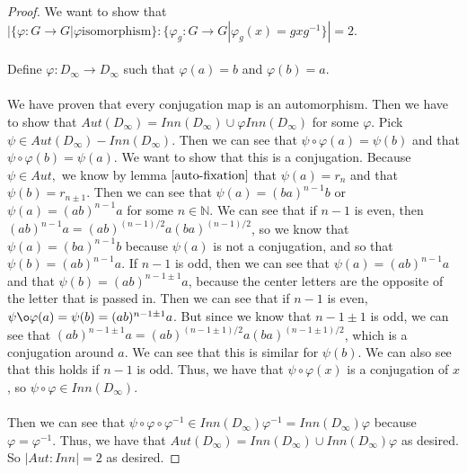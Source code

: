 \documentclass{article}
\theoremstyle{definition}
\begin{document}
\begin{proof}
    We want to show that $|\{\varphi: G \rightarrow G | \varphi \text{isomorphism}\}: \{\varphi_g : G \rightarrow G | \varphi_g(x) = gxg^{-1}\}| = 2$. \\
\\
Define $\varphi: D_\infty \rightarrow D_\infty$ such that $\varphi(a) = b$ and $\varphi(b) = a$.\\
\\
We have proven that every conjugation map is an automorphism.
Then we have to show that $Aut(D_\infty) = Inn(D_\infty) \cup \varphi Inn(D_\infty)$ for some $\varphi$.
Pick $\psi \in Aut(D_\infty) - Inn(D_\infty)$. Then we can see that $\psi \circ \varphi(a) = \psi(b)$ and that $\psi \circ \varphi(b) = \psi(a)$. We want to show that this is a conjugation. Because $\psi \in Aut,$ we know by lemma $\ref{auto-fixation}$ that $\psi(a) = r_n$ and that $\psi(b) = r_{n \pm 1}$. Then we can see that $\psi(a) = (ba)^{n-1}b$ or $\psi(a) = (ab)^{n-1}a$ for some $n \in \mathbb{N}$. We can see that if $n-1$ is even, then $(ab)^{n-1}a = (ab)^{(n-1)/2}a(ba)^{(n-1)/2}$, so we know that $\psi(a) = (ba)^{n-1}b$ because $\psi(a)$ is not a conjugation, and so that $\psi(b) = (ab)^{n-1}a$. If $n-1$ is odd, then we can see that $\psi(a) = (ab)^{n-1}a$ and that $\psi(b) = (ab)^{n-1\pm1}a$, because the center letters are the opposite of the letter that is passed in. Then we can see that if $n-1$ is even, $\psi \o \varphi(a) = \psi(b) = (ab)^{n-1\pm1}a$. But since we know that $n-1\pm1$ is odd, we can see that $(ab)^{n-1\pm1}a = (ab)^{(n-1\pm1)/2}a(ba)^{(n-1\pm1)/2}$, which is a conjugation around $a$. We can see that this is similar for $\psi(b)$. We can also see that this holds if $n-1$ is odd. Thus, we have that $\psi \circ \varphi(x)$ is a conjugation of $x$, so $\psi \circ \varphi \in Inn(D_\infty)$.\\
\\
Then we can see that $\psi \circ \varphi \circ \varphi^{-1} \in Inn(D_\infty) \varphi^{-1} = Inn(D_\infty) \varphi$ because $\varphi = \varphi^{-1}$. Thus, we have that $Aut(D_\infty) = Inn(D_\infty) \cup Inn(D_\infty) \varphi$ as desired. So $|Aut : Inn| = 2$ as desired.
\end{proof}
\end{document}
